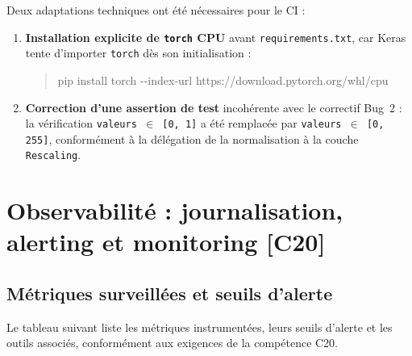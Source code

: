 \documentclass[french, a4paper, 12pt]{article}
\begin{document}
Deux adaptations techniques ont été nécessaires pour le CI :

\begin{enumerate}[leftmargin=1.5cm]
    \item \textbf{Installation explicite de \texttt{torch} CPU} avant
          \texttt{requirements.txt}, car Keras tente d'importer \texttt{torch}
          dès son initialisation :
          \begin{quote}\small\ttfamily
          pip install torch -{}-index-url https://download.pytorch.org/whl/cpu
          \end{quote}

    \item \textbf{Correction d'une assertion de test} incohérente avec le
          correctif Bug~2 : la vérification \texttt{valeurs~$\in$~[0,\,1]}
          a été remplacée par \texttt{valeurs~$\in$~[0,\,255]}, conformément
          à la délégation de la normalisation à la couche \texttt{Rescaling}.
\end{enumerate}

\section{Observabilité : journalisation, alerting et monitoring \textnormal{\small\textcolor{RNCPred}{[C20]}}}

\subsection{Métriques surveillées et seuils d'alerte}

Le tableau suivant liste les métriques instrumentées, leurs seuils d'alerte et les outils
associés, conformément aux exigences de la compétence C20.
\end{document}
